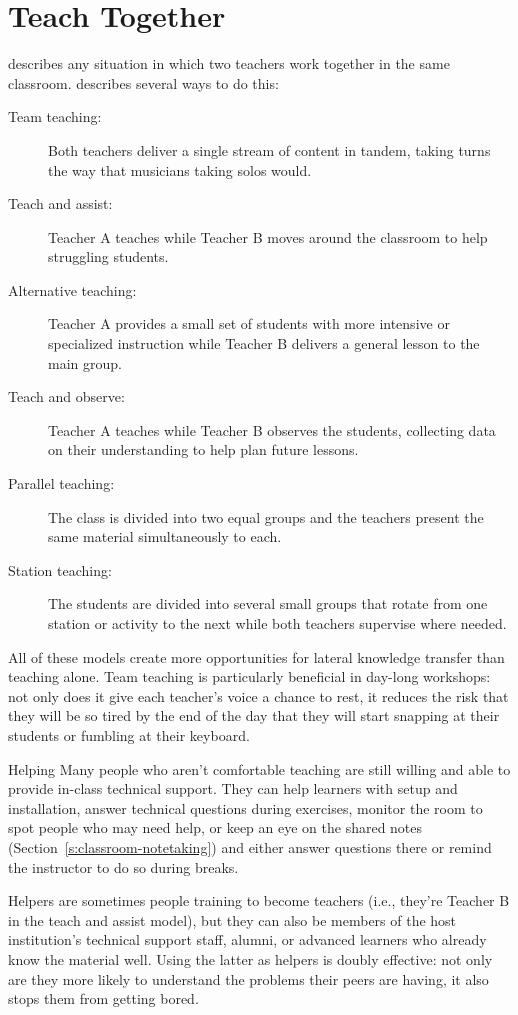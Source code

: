 \section{Teach Together}\label{s:classroom-together}

 describes any situation in
which two teachers work together in the same classroom.
\cite{Frie2016} describes several ways to do this:

\begin{description}
\item[Team teaching:]
Both teachers deliver a single stream of content in tandem, taking
turns the way that musicians taking solos would.
\item[Teach and assist:]
Teacher A teaches while Teacher B moves around the classroom to help
struggling students.
\item[Alternative teaching:]
Teacher A provides a small set of students with more intensive or
specialized instruction while Teacher B delivers a general lesson to
the main group.
\item[Teach and observe:]
Teacher A teaches while Teacher B observes the students, collecting
data on their understanding to help plan future lessons.
\item[Parallel teaching:]
The class is divided into two equal groups and the teachers present
the same material simultaneously to each.
\item[Station teaching:]
The students are divided into several small groups that rotate from
one station or activity to the next while both teachers supervise
where needed.
\end{description}

All of these models create more opportunities for lateral knowledge
transfer than teaching alone. Team teaching is particularly beneficial
in day-long workshops: not only does it give each teacher's voice a
chance to rest, it reduces the risk that they will be so tired by the
end of the day that they will start snapping at their students or
fumbling at their keyboard.

\begin{aside}{Helping}
  Many people who aren't comfortable teaching are still willing and able
  to provide in-class technical support. They can help learners with
  setup and installation, answer technical questions during exercises,
  monitor the room to spot people who may need help, or keep an eye on
  the shared notes (Section~\ref{s:classroom-notetaking}) and either
  answer questions there or remind the instructor to do so during
  breaks.

  Helpers are sometimes people training to become teachers (i.e.,
  they're Teacher B in the teach and assist model), but they can also
  be members of the host institution's technical support staff, alumni,
  or advanced learners who already know the material well. Using the
  latter as helpers is doubly effective: not only are they more likely
  to understand the problems their peers are having, it also stops them
  from getting bored.
\end{aside}

